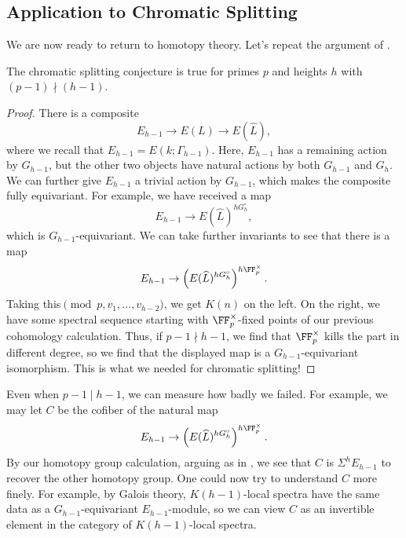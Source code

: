 \documentclass[../notes.tex]{subfiles}
\begin{document}

\subsection{Application to Chromatic Splitting}
We are now ready to return to homotopy theory. Let's repeat the argument of .
\begin{theorem}
	The chromatic splitting conjecture is true for primes $p$ and heights $h$ with $(p-1)\nmid(h-1)$.
\end{theorem}
\begin{proof}
	There is a composite
	\[E_{h-1}\to E(L)\to E(\widehat L),\]
	where we recall that $E_{h-1}=E(k;\Gamma_{h-1})$. Here, $E_{h-1}$ has a remaining action by $G_{h-1}$, but the other two objects have natural actions by both $G_{h-1}$ and $G_h$. We can further give $E_{h-1}$ a trivial action by $G_{h-1}$, which makes the composite fully equivariant. For example, we have received a map
	\[E_{h-1}\to E(\widehat L)^{hG^\circ_h},\]
	which is $G_{h-1}$-equivariant. We can take further invariants to see that there is a map
	\[E_{h-1}\to\left(E(\widehat L)^{hG^\circ_h}\right)^{h\FF_p^\times}.\]
	Taking this$\pmod{p,v_1,\ldots,v_{h-2}}$, we get  $K(n)$ on the left. On the right, we have some spectral sequence starting with $\FF_p^\times$-fixed points of our previous cohomology calculation. Thus, if $p-1\nmid h-1$, we find that $\FF_p^\times$ kills the part in different degree, so we find that the displayed map is a $G_{h-1}$-equivariant isomorphism. This is what we needed for chromatic splitting!
\end{proof}
\begin{remark}
	Even when $p-1\mid h-1$, we can measure how badly we failed. For example, we may let $C$ be the cofiber of the natural map
	\[E_{h-1}\to\left(E(\widehat L)^{hG^\circ_h}\right)^{h\FF_p^\times}.\]
	By our homotopy group calculation, arguing as in , we see that $C$ is $\Sigma^hE_{h-1}$ to recover the other homotopy group. One could now try to understand $C$ more finely. For example, by Galois theory, $K(h-1)$-local spectra have the same data as a $G_{h-1}$-equivariant $E_{h-1}$-module, so we can view $C$ as an invertible element in the category of $K(h-1)$-local spectra.
\end{remark}
\end{document}
